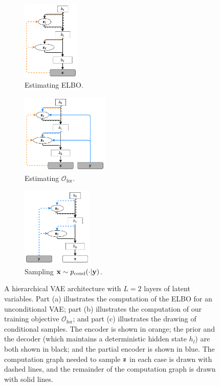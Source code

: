 \begin{figure}[t]
  \centering
  \begin{subfigure}[b]{.32\textwidth}
    \centering
    \includegraphics[height=3.8cm]{figs/cigcvae/arch_small-standard.pdf}
    \caption{Estimating ELBO.}
    \label{fig:cigcvae-hierarchical-vae}
  \end{subfigure}
  \begin{subfigure}[b]{.32\textwidth}
    \centering
    \includegraphics[height=3.8cm]{figs/cigcvae/arch_small-forward.pdf}
    \caption{Estimating $\mathcal{O}_\mathrm{for}$.}
    \label{fig:cigcvae-forward-arch}
  \end{subfigure}
  \begin{subfigure}[b]{.32\textwidth}
    \centering
    \includegraphics[height=3.8cm]{figs/cigcvae/arch_small-sampling.pdf}
    \caption{Sampling $\mathbf{x}{}\sim p_{\text{cond}}{}(\cdot|\mathbf{y}{})$.}
    \label{fig:cigcvae-reverse-arch}
  \end{subfigure}
  \vspace{-1mm}
  \caption{A hierarchical VAE architecture with $L=2$ layers of latent
    variables. Part (a) illustrates the computation of the ELBO for an
    unconditional VAE; part (b) illustrates the computation of our training
    objective $\mathcal{O}_\mathrm{for}$; and part (c) illustrates the drawing
    of conditional samples. The encoder is shown in orange; the prior and the
    decoder (which maintains a deterministic hidden state $h_{l}$) are both
    shown in black; and the partial encoder is shown in blue. The computation
    graph needed to sample $\mathbf{z}{}$ in each case is drawn with dashed lines, and
    the remainder of the computation graph is drawn with solid lines.}
  \label{fig:cigcvae-conditional-architectures}
  \vspace{-2mm}
\end{figure}

